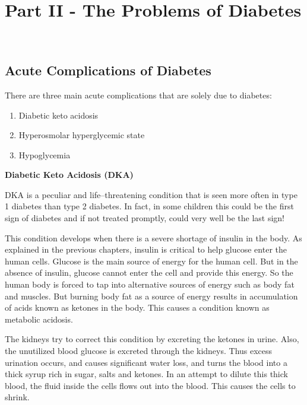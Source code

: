 
\part{\textbf{Part II - The Problems of Diabetes}}

\newpage
~\phantom{a}
\thispagestyle{empty}
\newpage

\chapter{Acute Complications of Diabetes}\label{chap10}

There are three main acute complications that are solely due to diabetes:

\vspace{-\topsep}
\begin{enumerate}
\itemsep=0pt
\item Diabetic keto acidosis
\item Hyperosmolar hyperglycemic state
\item Hypoglycemia
\end{enumerate}
 
\noindent\textbf{Diabetic Keto Acidosis (DKA)}

DKA is a peculiar and life–threatening condition that is seen more often in type 1 diabetes than type 2 diabetes. In fact, in some children this could be the first sign of diabetes and if not treated promptly, could very well be the last sign!

This condition develops when there is a severe shortage of insulin in the body. As explained in the previous chapters, insulin is critical to help glucose enter the human cells. Glucose is the main source of energy for the human cell. But in the absence of insulin, glucose cannot enter the cell and provide this energy. So the human body is forced to tap into alternative sources of energy such as body fat and muscles. But burning body fat as a source of energy results in accumulation of acids known as ketones in the body. This causes a condition known as metabolic acidosis.

The kidneys try to correct this condition by excreting the ketones in urine. Also, the unutilized blood glucose is excreted through the kidneys. Thus excess urination occurs, and causes significant water loss, and turns the blood into a thick syrup rich in sugar, salts and ketones. In an attempt to dilute this thick blood, the fluid inside the cells flows out into the blood. This causes the cells to shrink.

